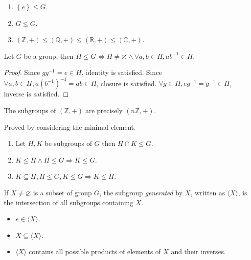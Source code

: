 \documentclass[a4paper]{article}
\begin{document}
\begin{example}
  \begin{enumerate}[(1)]
    \item $ \left\{ e\right\} \le G $.
    \item $ G\le G $.
    \item $ (\mathbb{Z} ,+)\le (\mathbb{Q} ,+)\le (\mathbb{R} ,+)\le
      (\mathbb{C} ,+) $.
  \end{enumerate}
\end{example}
\begin{lemma}\label{lma:subgroup test}
  Let $ G $ be a group, then $ H\le G \Leftrightarrow H\neq
  \varnothing \land \forall a,b\in H, ab^{-1}\in H $.
\end{lemma}
\begin{proof}
  Since $gg^{-1}=e\in H$, identity is satisfied. Since $ \forall
  a,b\in H, a(b^{-1})^{-1}=ab\in H $, closure is satisfied. $ \forall
  g\in H, eg^{-1}=g^{-1}\in H $, inverse is satisfied.
\end{proof}
\begin{proposition}\label{prop:subgroups of integers}
  The subgroups of $ (\mathbb{Z} ,+) $ are precisely $ (n \mathbb{Z} ,+) $.
\end{proposition}
Proved by considering the minimal element.
\begin{proposition}\label{prop:comparing_groups}
  \begin{enumerate}[(1)]
    \item Let $ H,K $ be subgroups of $G$ then $ H\cap K\le G $.
    \item $ K\le H \land H\le G \Rightarrow K\le G $.
    \item $ K \subseteq H, H\le G, K\le G \Rightarrow K\le H $.
  \end{enumerate}
\end{proposition}
\begin{definition}
  If $ X\neq \varnothing $ is a subset of group $G$, the subgroup
  \textit{generated} by $X$, written as $ \langle X \rangle $, is the
  intersection of all subgroups containing $X$.
\end{definition}
\begin{remark}
  \begin{itemize}
    \item $ e\in \langle X \rangle $.
    \item $ X \subseteq \langle X \rangle $.
    \item $ \langle X \rangle $ contains all possible products of
      elements of $X$ and their inverses.
  \end{itemize}
\end{remark}
\end{document}
